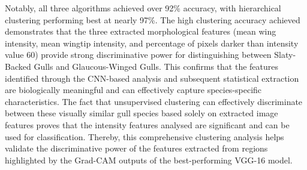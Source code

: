 \documentclass[a4paper,12pt]{report}
\begin{document}
Notably, all three algorithms achieved over 92\% accuracy, with hierarchical clustering performing best at nearly 97\%. The high clustering accuracy achieved demonstrates that the three extracted morphological features (mean wing intensity, mean wingtip intensity, and percentage of pixels darker than intensity value 60) provide strong discriminative power for distinguishing between Slaty-Backed Gulls and Glaucous-Winged Gulls. This confirms that the features identified through the CNN-based analysis and subsequent statistical extraction are biologically meaningful and can effectively capture species-specific characteristics. The fact that unsupervised clustering can effectively discriminate between these visually similar gull species based solely on extracted image features proves that the intensity features analysed are significant and can be used for classification. Thereby, this comprehensive clustering analysis helps validate the discriminative power of the features extracted from regions highlighted by the Grad-CAM outputs of the best-performing VGG-16 model.



\end{document}
